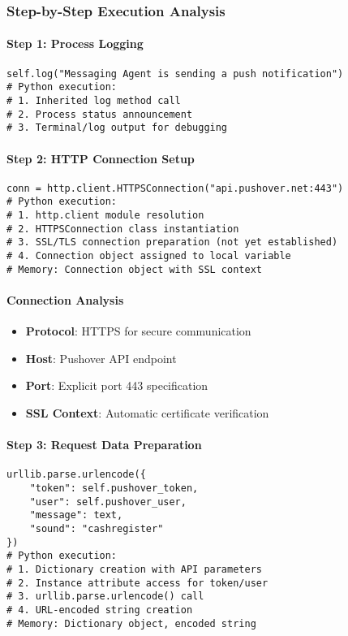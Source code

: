 \subsubsection{Step-by-Step Execution Analysis}

\paragraph{Step 1: Process Logging}
\begin{lstlisting}[caption=Notification Process Start]
self.log("Messaging Agent is sending a push notification")
# Python execution:
# 1. Inherited log method call
# 2. Process status announcement
# 3. Terminal/log output for debugging
\end{lstlisting}

\paragraph{Step 2: HTTP Connection Setup}
\begin{lstlisting}[caption=HTTPS Connection Establishment]
conn = http.client.HTTPSConnection("api.pushover.net:443")
# Python execution:
# 1. http.client module resolution
# 2. HTTPSConnection class instantiation
# 3. SSL/TLS connection preparation (not yet established)
# 4. Connection object assigned to local variable
# Memory: Connection object with SSL context
\end{lstlisting}

\paragraph{Connection Analysis}
\begin{itemize}
\item \textbf{Protocol}: HTTPS for secure communication
\item \textbf{Host}: Pushover API endpoint
\item \textbf{Port}: Explicit port 443 specification
\item \textbf{SSL Context}: Automatic certificate verification
\end{itemize}

\paragraph{Step 3: Request Data Preparation}
\begin{lstlisting}[caption=HTTP Request Construction]
urllib.parse.urlencode({
    "token": self.pushover_token,
    "user": self.pushover_user,
    "message": text,
    "sound": "cashregister"
})
# Python execution:
# 1. Dictionary creation with API parameters
# 2. Instance attribute access for token/user
# 3. urllib.parse.urlencode() call
# 4. URL-encoded string creation
# Memory: Dictionary object, encoded string
\end{lstlisting}


